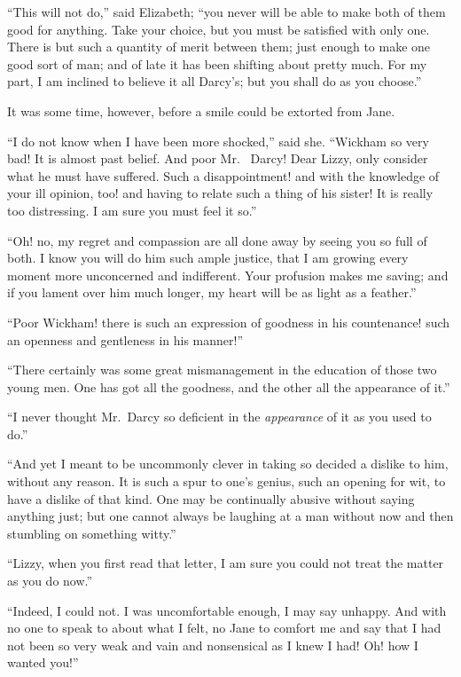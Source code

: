 ``This will not do,'' said Elizabeth; ``you never will be able to
make both of them good for anything.  Take your choice, but
you must be satisfied with only one.  There is but such a quantity
of merit between them; just enough to make one good sort of
man; and of late it has been shifting about pretty much.  For my
part, I am inclined to believe it all Darcy's; but you shall do
as you choose.''

It was some time, however, before a smile could be extorted
from Jane.

``I do not know when I have been more shocked,'' said she.
``Wickham so very bad!  It is almost past belief.  And poor Mr.\ %
Darcy!  Dear Lizzy, only consider what he must have suffered.
Such a disappointment! and with the knowledge of your ill
opinion, too! and having to relate such a thing of his sister!
It is really too distressing.  I am sure you must feel it so.''

``Oh! no, my regret and compassion are all done away by seeing
you so full of both.  I know you will do him such ample justice,
that I am growing every moment more unconcerned and indifferent.
Your profusion makes me saving; and if you lament over him much
longer, my heart will be as light as a feather.''

``Poor Wickham! there is such an expression of goodness in his
countenance! such an openness and gentleness in his manner!''

``There certainly was some great mismanagement in the education
of those two young men.  One has got all the goodness, and the
other all the appearance of it.''

``I never thought Mr.\ Darcy so deficient in the \emph{appearance}
of it as you used to do.''

``And yet I meant to be uncommonly clever in taking so decided
a dislike to him, without any reason.  It is such a spur to one's
genius, such an opening for wit, to have a dislike of that kind.
One may be continually abusive without saying anything just; but
one cannot always be laughing at a man without now and then
stumbling on something witty.''

``Lizzy, when you first read that letter, I am sure you could not
treat the matter as you do now.''

``Indeed, I could not.  I was uncomfortable enough, I may say
unhappy.  And with no one to speak to about what I felt, no
Jane to comfort me and say that I had not been so very weak and
vain and nonsensical as I knew I had!  Oh! how I wanted you!''

